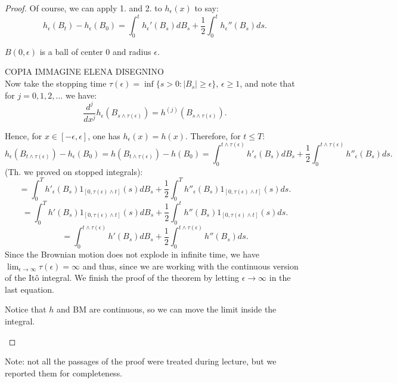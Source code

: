 \begin{ProofBox}
\begin{proof}
Of course, we can apply 1. and 2. to $h_\epsilon(x)$ to say:
\[
h_\epsilon(B_t) - h_\epsilon(B_0) = \int_0^t h_\epsilon'(B_s) dB_s + \frac{1}{2} \int_0^t h_\epsilon''(B_s) ds.
\]
\begin{remark}
    $B(0,\epsilon)$ is a ball of center $0$ and radius $\epsilon$. 
\end{remark}
COPIA IMMAGINE ELENA DISEGNINO\\

Now take the stopping time $\tau(\epsilon) = \inf \{ s > 0 : |B_s| \geq \epsilon \}$, $\epsilon \geq 1$, and note that for $j = 0, 1, 2, \dots$ we have:
\[
\frac{d^j}{dx^j} h_\epsilon(B_{s \wedge \tau(\epsilon)}) = h^{(j)}(B_{s \wedge \tau(\epsilon)}).
\]

Hence, for $x \in [-\epsilon, \epsilon]$, one has $h_\epsilon(x) = h(x)$. Therefore, for $t \leq T$:
\[
h_\epsilon(B_{t \wedge \tau(\epsilon)}) - h_\epsilon(B_0) = h(B_{t \wedge \tau(\epsilon)}) - h(B_0) = \int_0^{t \wedge \tau(\epsilon)} h'_\epsilon(B_s) dB_s + \frac{1}{2} \int_0^{t \wedge \tau(\epsilon)} h''_\epsilon(B_s) ds.
\]
(Th. we proved on stopped integrals):
\[
= \int_0^{T} h'_\epsilon(B_s) 1_{[0, \tau(\epsilon) \wedge t]}(s) dB_s + \frac{1}{2} \int_0^{T} h''_\epsilon(B_s) 1_{[0, \tau(\epsilon) \wedge t]}(s) ds.
\]
\[
= \int_0^{T} h'(B_s) 1_{[0, \tau(\epsilon) \wedge t]}(s) dB_s + \frac{1}{2} \int_0^{t} h''(B_s) 1_{[0, \tau(\epsilon) \wedge t]}(s) ds.
\]
\[
= \int_0^{t \wedge \tau(\epsilon)} h'(B_s) dB_s + \frac{1}{2} \int_0^{t \wedge \tau(\epsilon)} h''(B_s) ds.
\]
Since the Brownian motion does not explode in infinite time, we have $\lim_{\epsilon \to \infty} \tau(\epsilon) = \infty$ and thus, since we are working with the continuous version of the Itô integral. We finish the proof of the theorem by letting $\epsilon \to \infty$ in the last equation.
\begin{remark}
    Notice that $h$ and BM are continuous, so we can move the limit inside the integral.
\end{remark}
\end{proof}
\end{ProofBox}
\begin{remark}
    Note: not all the passages of the proof were treated during lecture, but we reported them for completeness. 
\end{remark}

